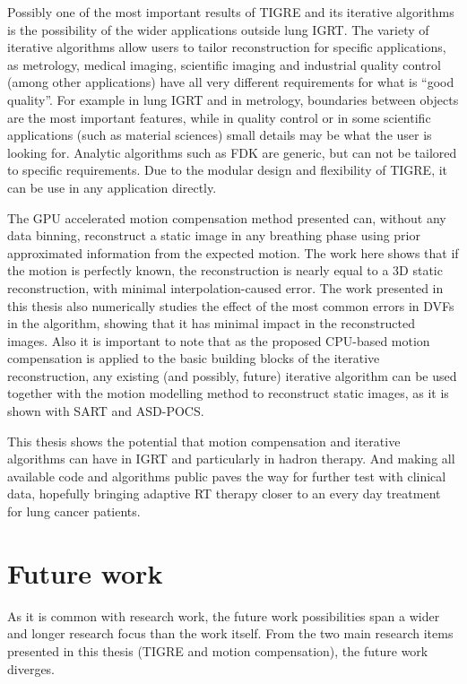 Possibly one of the most important results of TIGRE and its iterative algorithms is the possibility of the wider applications outside lung IGRT. The variety of iterative algorithms allow users to tailor reconstruction for specific applications, as metrology, medical imaging, scientific imaging and industrial quality control (among other applications) have all very different requirements for what is ``good quality''. For example in lung IGRT and in metrology, boundaries between objects are the most important features, while in quality control or in some scientific applications (such as material sciences) small details may be what the user is looking for. Analytic algorithms such as FDK are generic, but can not be tailored to specific requirements. Due to the modular design and flexibility of TIGRE, it can be use in any application directly.


The GPU accelerated motion compensation method presented can, without any data binning, reconstruct a static image in any breathing phase using prior approximated information from the expected motion. The work here shows that if the motion is perfectly known, the reconstruction is nearly equal to a 3D static reconstruction, with minimal interpolation-caused error. The work presented in this thesis also numerically studies the effect of the most common errors in DVFs in the algorithm, showing that it has minimal impact in the reconstructed images. Also it is important to note that as the proposed CPU-based motion compensation is applied to the basic building blocks of the iterative reconstruction, any existing (and possibly, future) iterative algorithm can be used together with the motion modelling method to reconstruct static images, as it is shown with SART and ASD-POCS. 

This thesis shows the potential that motion compensation and iterative algorithms can have in IGRT and particularly in hadron therapy. And making all available code and algorithms public paves the way for further test with clinical data, hopefully bringing adaptive RT therapy closer to an every day treatment for lung cancer patients.


\section{Future work}

As it is common with research work, the future work possibilities span a wider and longer research focus than the work itself. From the two main research items presented  in this thesis (TIGRE and motion compensation), the future work diverges.

